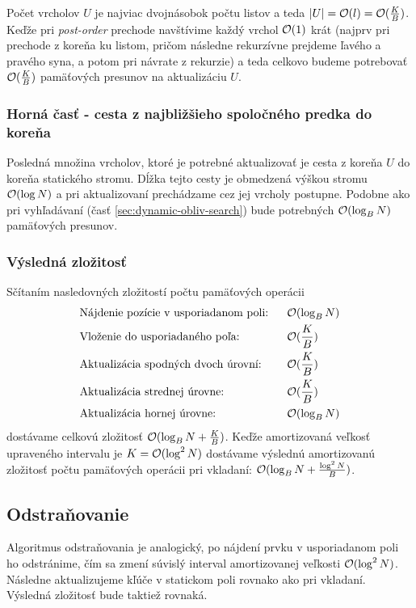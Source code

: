 Počet vrcholov $U$ je najviac dvojnásobok počtu listov a teda $|U| = \mathcal{O}(l) = \mathcal{O}(\frac{K}{B})$. Keďže pri \emph{post-order} prechode navštívime každý vrchol $\mathcal{O}(1)$ krát (najprv pri prechode z koreňa ku listom, pričom následne rekurzívne prejdeme ľavého a pravého syna, a potom pri návrate z rekurzie) a teda celkovo budeme potrebovať $\mathcal{O}(\frac{K}{B})$ pamäťových presunov na aktualizáciu $U$.

\subsubsection{Horná časť - cesta z najbližšieho spoločného predka do koreňa}
Posledná množina vrcholov, ktoré je potrebné aktualizovať je cesta z koreňa $U$ do koreňa statického stromu. Dĺžka tejto cesty je obmedzená výškou stromu $\mathcal{O}(\log{N})$ a pri aktualizovaní prechádzame cez jej vrcholy postupne. Podobne ako pri vyhľadávaní (časť \ref{sec:dynamic-obliv-search}) bude potrebných $\mathcal{O}(\log_B{N})$ pamäťových presunov.

\subsubsection{Výsledná zložitosť}
Sčítaním nasledovných zložitostí počtu pamäťových operácii
\[
\begin{aligned}
&\text{Nájdenie pozície v usporiadanom poli:} ~~ &&\mathcal{O}(\log_B{N}) \\
&\text{Vloženie do usporiadaného poľa:} &&\mathcal{O}(\frac{K}{B}) \\
&\text{Aktualizácia spodných dvoch úrovní:} &&\mathcal{O}(\frac{K}{B}) \\
&\text{Aktualizácia strednej úrovne:} &&\mathcal{O}(\frac{K}{B}) \\
&\text{Aktualizácia hornej úrovne:} &&\mathcal{O}(\log_B{N}) \\
\end{aligned}
\]
dostávame celkovú zložitosť $\mathcal{O}(\log_B{N} + \frac{K}{B})$. Keďže amortizovaná veľkosť upraveného intervalu je $K = \mathcal{O}(\log^2{N})$ dostávame výslednú amortizovanú zložitosť počtu pamäťových operácii pri vkladaní: $\mathcal{O}(\log_B{N} + \frac{\log^2{N}}{B})$.

\subsection{Odstraňovanie}
Algoritmus odstraňovania je analogický, po nájdení prvku v usporiadanom poli ho odstránime, čím sa zmení súvislý interval amortizovanej veľkosti $\mathcal{O}(\log^2{N})$. Následne aktualizujeme kľúče v statickom poli rovnako ako pri vkladaní. Výsledná zložitosť bude taktiež rovnaká.

